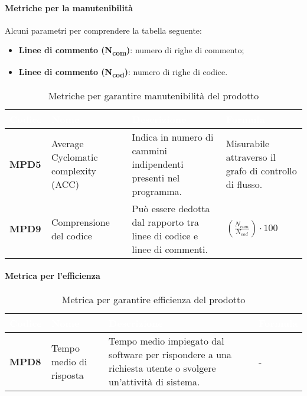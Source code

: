 \paragraph{Metriche per la manutenibilità}
Alcuni parametri per comprendere la tabella seguente:
\begin{itemize}
	\item \textbf{Linee di commento (N\textsubscript{com})}: numero di righe di commento;
	\item \textbf{Linee di commento (N\textsubscript{cod})}: numero di righe di codice.
\end{itemize}
\renewcommand{\arraystretch}{1.5}
\renewcommand\extrarowheight{1.5pt}
\begin{longtable}{C{1.5cm} C{4.5cm} C{5.5cm} C{5cm}}
		\textcolor{white}{\textbf{Codice}} & 
		\textcolor{white}{\textbf{Nome}} & 
		\textcolor{white}{\textbf{Descrizione}} & 
		\textcolor{white}{\textbf{Formula}} \\
		\endfirsthead
	    \endfoot
	    \caption{Metriche per garantire manutenibilità del prodotto}
	    \endlastfoot
		\hline
		\textbf{MPD5} & 
		Average Cyclomatic complexity (ACC) & 
		Indica in numero di cammini indipendenti presenti nel programma. & Misurabile attraverso il grafo di controllo di flusso.\\
		\textbf{MPD9} & 
		Comprensione del codice & 
		Può essere dedotta dal rapporto tra linee di codice e linee di commenti. &
		$(\frac{N_{com}}{N_{cod}}) \cdot 100 $ \\
		
\end{longtable}
\paragraph{Metrica per l'efficienza}
\renewcommand{\arraystretch}{1.5}
\renewcommand\extrarowheight{1.5pt}
\begin{longtable}{C{1.5cm} C{4.5cm} C{5.5cm} C{5cm}}
		\textcolor{white}{\textbf{Codice}} & 
		\textcolor{white}{\textbf{Nome}} & 
		\textcolor{white}{\textbf{Descrizione}} & 
		\textcolor{white}{\textbf{Formula}} \\
		\endfirsthead
	    \endfoot
	    \caption{Metrica per garantire efficienza del prodotto}
	    \endlastfoot
		\hline
		\textbf{MPD8} & 
		Tempo medio di risposta & 
		Tempo medio impiegato dal software per rispondere a una richiesta utente o svolgere un'attività di sistema. &
		- \\
\end{longtable}		

